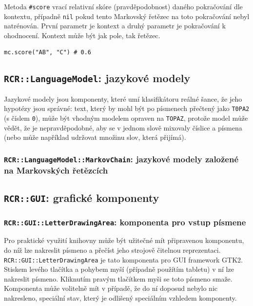 \documentclass[a4paper]{article}
\begin{document}
Metoda \texttt{\#score} vrací relativní skóre (pravděpodobnost) daného
pokračování dle kontextu, případně \texttt{nil} pokud tento Markovský řetězec
na toto pokračování nebyl natrénován. První parametr je kontext a druhý parametr
je pokračování k ohodnocení. Kontext může být jak pole, tak řetězec.
\begin{lstlisting}
mc.score("AB", "C") # 0.6
\end{lstlisting}

\subsection{\texttt{RCR::LanguageModel}: jazykové modely}
Jazykové modely jsou komponenty, které umí klasifikátoru 
reálné šance, že jeho hypotézy jsou správné: text,
který by mohl být po písmenech přečtený jako \texttt{T0PA2} (s číslem
\texttt{0}), může být vhodným modelem opraven na \texttt{TOPAZ}, protože
model může vědět, že je nepravděpodobné, aby se v jednom slově mixovaly
číslice a písmena (nebo může například udržovat množinu slov, která
přijímá).


\subsubsection{\texttt{RCR::LanguageModel::MarkovChain}: jazykové modely
založené na Markovských řetězcích}

\subsection{\texttt{RCR::GUI}: grafické komponenty}
\subsubsection{\texttt{RCR::GUI::LetterDrawingArea}: komponenta pro vstup
písmene}
Pro praktické využití knihovny může být užitečné mít připravenou komponentu,
do níž lze nakreslit písmeno a přečíst jeho strojově čitelnou reprezentaci.
\texttt{RCR::GUI::LetterDrawingArea} je tato komponenta pro GUI framework GTK2.
Stiskem levého tlačítka a pohybem myší (případně použítím tabletu) v ní lze
nakreslit písmeno. Kliknutím pravým tlačítkem myši se toto písmeno smaže.
Komponenta může volitelně mít v případě, že do ní doposud nebylo nic nakresleno,
speciální stav, který je odlišený speciálním vzhledem komponenty.
\end{document}
